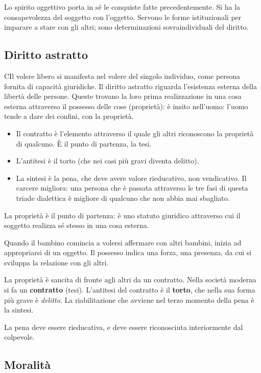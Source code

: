 \documentclass[a4paper, twoside, titlepage]{book}
\begin{document}
Lo spirito oggettivo porta in sé le conquiste fatte precedentemente. Si ha la consapevolezza del soggetto con l'oggetto.
Servono le forme istituzionali per imparare a stare con gli altri; sono determinazioni sovraindividuali del diritto.

\subsection{Diritto astratto}

CIl volere libero si manifesta nel volere del singolo individuo, come persona fornita di capacità giuridiche. Il diritto astratto riguarda l'esistenza esterna della libertà delle persone. Queste trovano la loro prima realizzazione in una cosa esterna attraverso il possesso delle cose (proprietà): è insito nell'uomo: l'uomo tende a dare dei confini, con la proprietà.

\begin{itemize}
\item Il contratto è l'elemento attraverso il quale gli altri riconoscono la proprietà di qualcuno. È il punto di partenza, la tesi.
\item L'antitesi è il torto (che nei casi più gravi diventa delitto).
\item La sintesi è la pena, che deve avere valore rieducativo, non vendicativo. Il carcere migliora: una persona che è passata attraverso le tre fasi di questa triade dialettica è migliore di qualcuno che non abbia mai sbagliato.
\end{itemize}

La proprietà è il punto di partenza: è uno statuto giuridico attraverso cui il soggetto realizza sé stesso in una cosa esterna.

Quando il bambino comincia a volersi affermare con altri bambini, inizia ad appropriarsi di un oggetto. Il possesso indica una forza, una presenza, da cui si sviluppa la relazione con gli altri.

La proprietà è sancita di fronte agli altri da un contratto. Nella società moderna si fa un \textbf{contratto} (tesi). L'antitesi del contratto è il \textbf{torto}, che nella sua forma più grave è \textit{delitto}.
La riabilitazione che avviene nel terzo momento della pena è la sintesi.

La pena deve essere rieducativa, e deve essere riconosciuta interiormente dal colpevole.

\subsection{Moralità}
\end{document}

